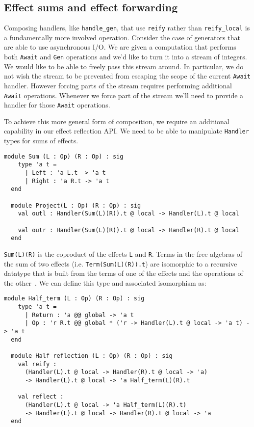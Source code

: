 \documentclass[acmsmall, screen, review, anonymous]{acmart}
\theoremstyle{definition}
\begin{document}
\subsection{Effect sums and effect forwarding}

Composing handlers, like \lstinline[style=oxcaml]{handle_gen}, that use
\lstinline[style=oxcaml]{reify} rather than
\lstinline[style=oxcaml]{reify_local} is a fundamentally more involved
operation. Consider the case of generators that are able to use
asynchronous I/O. We are given a computation that performs both
\lstinline[style=oxcaml]{Await} and \lstinline[style=oxcaml]{Gen}
operations and we'd like to turn it into a stream of integers.  We would
like to be able to freely pass this stream around. In particular, we do
not wish the stream to be prevented from escaping the scope of the
current \lstinline[style=oxcaml]{Await} handler.  However forcing parts
of the stream requires performing additional
\lstinline[style=oxcaml]{Await} operations. Whenever we force part of the
stream we'll need to provide a handler for those
\lstinline[style=oxcaml]{Await} operations.

To achieve this more general form of composition, we require an
additional capability in our effect reflection API. We need to be able
to manipulate \lstinline[style=oxcaml]{Handler} types for sums of
effects.
\begin{lstlisting}[style=oxcaml]
  module Sum (L : Op) (R : Op) : sig
    type 'a t =
      | Left : 'a L.t -> 'a t
      | Right : 'a R.t -> 'a t
  end

  module Project(L : Op) (R : Op) : sig
    val outl : Handler(Sum(L)(R)).t @ local -> Handler(L).t @ local

    val outr : Handler(Sum(L)(R)).t @ local -> Handler(R).t @ local
  end
\end{lstlisting}

\lstinline[style=oxcaml]{Sum(L)(R)} is the coproduct of the effects
\lstinline[style=oxcaml]{L} and \lstinline[style=oxcaml]{R}. Terms in
the free algebras of the sum of two effects
(i.e. \lstinline[style=oxcaml]{Term(Sum(L)(R)).t}) are isomorphic to a
recursive datatype that is built from the terms of one of the effects
and the operations of the other~\cite{hyland2006combining}. We can define
this type and associated isomorphism as:
\begin{lstlisting}[style=oxcaml]
  module Half_term (L : Op) (R : Op) : sig
    type 'a t =
      | Return : 'a @@ global -> 'a t
      | Op : 'r R.t @@ global * ('r -> Handler(L).t @ local -> 'a t) -> 'a t
  end

  module Half_reflection (L : Op) (R : Op) : sig
    val reify :
      (Handler(L).t @ local -> Handler(R).t @ local -> 'a)
      -> Handler(L).t @ local -> 'a Half_term(L)(R).t

    val reflect :
      (Handler(L).t @ local -> 'a Half_term(L)(R).t)
      -> Handler(L).t @ local -> Handler(R).t @ local -> 'a
  end
\end{lstlisting}
\end{document}
